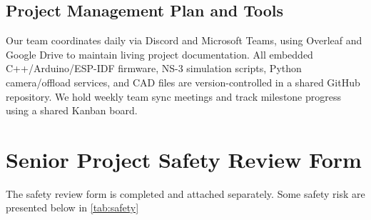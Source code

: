 \documentclass[12pt, letterpaper]{article}
\begin{document}
\subsection{Project Management Plan and Tools}
Our team coordinates daily via Discord and Microsoft Teams, using Overleaf and Google Drive to maintain living project documentation. All embedded C++/Arduino/ESP-IDF firmware, NS-3 simulation scripts, Python camera/offload services, and CAD files are version-controlled in a shared GitHub repository. We hold weekly team sync meetings and track milestone progress using a shared Kanban board.


\newpage



\newpage
\appendix
\section{Senior Project Safety Review Form}

The safety review form is completed and attached separately. Some safety risk are presented below in \ref{tab:safety}
\end{document}
